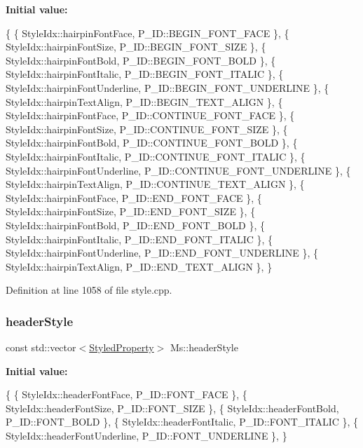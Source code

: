 {\bfseries Initial value\+:}
\begin{DoxyCode}
\{
      \{ StyleIdx::hairpinFontFace,                    P\_ID::BEGIN\_FONT\_FACE            \},
      \{ StyleIdx::hairpinFontSize,                    P\_ID::BEGIN\_FONT\_SIZE            \},
      \{ StyleIdx::hairpinFontBold,                    P\_ID::BEGIN\_FONT\_BOLD            \},
      \{ StyleIdx::hairpinFontItalic,                  P\_ID::BEGIN\_FONT\_ITALIC          \},
      \{ StyleIdx::hairpinFontUnderline,               P\_ID::BEGIN\_FONT\_UNDERLINE       \},
      \{ StyleIdx::hairpinTextAlign,                   P\_ID::BEGIN\_TEXT\_ALIGN           \},
      \{ StyleIdx::hairpinFontFace,                    P\_ID::CONTINUE\_FONT\_FACE         \},
      \{ StyleIdx::hairpinFontSize,                    P\_ID::CONTINUE\_FONT\_SIZE         \},
      \{ StyleIdx::hairpinFontBold,                    P\_ID::CONTINUE\_FONT\_BOLD         \},
      \{ StyleIdx::hairpinFontItalic,                  P\_ID::CONTINUE\_FONT\_ITALIC       \},
      \{ StyleIdx::hairpinFontUnderline,               P\_ID::CONTINUE\_FONT\_UNDERLINE    \},
      \{ StyleIdx::hairpinTextAlign,                   P\_ID::CONTINUE\_TEXT\_ALIGN        \},
      \{ StyleIdx::hairpinFontFace,                    P\_ID::END\_FONT\_FACE              \},
      \{ StyleIdx::hairpinFontSize,                    P\_ID::END\_FONT\_SIZE              \},
      \{ StyleIdx::hairpinFontBold,                    P\_ID::END\_FONT\_BOLD              \},
      \{ StyleIdx::hairpinFontItalic,                  P\_ID::END\_FONT\_ITALIC            \},
      \{ StyleIdx::hairpinFontUnderline,               P\_ID::END\_FONT\_UNDERLINE         \},
      \{ StyleIdx::hairpinTextAlign,                   P\_ID::END\_TEXT\_ALIGN             \},
      \}
\end{DoxyCode}


Definition at line 1058 of file style.\+cpp.

\mbox{\label{namespace_ms_adb21d8d6e7c3840e43c33af4d6604378}} 
\subsubsection{\texorpdfstring{header\+Style}{headerStyle}}
{\footnotesize\ttfamily const std\+::vector$<$\hyperlink{struct_ms_1_1_styled_property}{Styled\+Property}$>$ Ms\+::header\+Style}

{\bfseries Initial value\+:}
\begin{DoxyCode}
\{
      \{ StyleIdx::headerFontFace,                     P\_ID::FONT\_FACE              \},
      \{ StyleIdx::headerFontSize,                     P\_ID::FONT\_SIZE              \},
      \{ StyleIdx::headerFontBold,                     P\_ID::FONT\_BOLD              \},
      \{ StyleIdx::headerFontItalic,                   P\_ID::FONT\_ITALIC            \},
      \{ StyleIdx::headerFontUnderline,                P\_ID::FONT\_UNDERLINE         \},
      \}
\end{DoxyCode}


